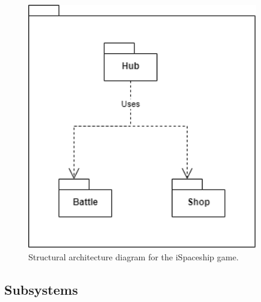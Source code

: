 \documentclass[]{article}
\begin{document}
\begin{figure}[H]
    \centering
    \includegraphics[width=10cm]{StructuralArchitecture.png}
    \caption{Structural architecture diagram for the iSpaceship game.}
    \label{fig:ca}
\end{figure}


\subsection{Subsystems}
\label{sub:subsystems}
\end{document}
